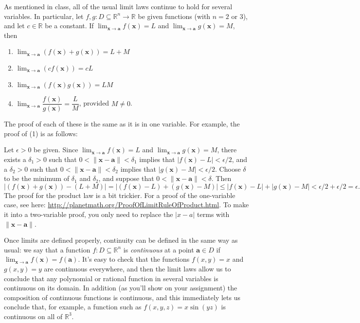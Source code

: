 \documentclass[letterpaper,12pt]{article}
\newcommand{\aaa}{\mathbf{a}}
\newcommand{\abs}[1]{\lvert #1\rvert}
\newcommand{\len}[1]{\lVert #1\rVert}
\newcommand{\x}{\mathbf{x}}
\newcommand{\R}{\mathbb{R}}
\newcommand{\di}{\displaystyle}
\begin{document}
As mentioned in class, all of the usual limit laws continue to hold for several variables. In particular, let $f,g:D\subseteq\R^n\to \R$ be given functions (with $n=2$ or 3), and let $c\in\R$ be a constant. If $\di \lim_{\x\to\aaa}f(\x) = L$ and $\di \lim_{\x\to\aaa}g(\x)=M$, then
\begin{enumerate}
 \item $\lim_{\x\to\aaa}(f(\x)+g(\x)) = L+M$
 \item $\lim_{\x\to\aaa}(cf(\x)) = cL$
 \item $\lim_{\x\to\aaa}(f(\x)g(\x)) = LM$
 \item $\lim_{\x\to\aaa}\dfrac{f(\x)}{g(\x)} = \dfrac{L}{M}$, provided $M\neq 0$.
\end{enumerate}
The proof of each of these is the same as it is in one variable. For example, the proof of (1) is as follows:

\medskip

Let $\epsilon>0$ be given. Since $\di \lim_{\x\to\aaa}f(\x) = L$ and $\di \lim_{\x\to\aaa}g(\x)=M$, there exists a $\delta_1>0$ such that $0<\len{\x-\aaa}<\delta_1$ implies that $\abs{f(\x)-L}<\epsilon/2$, and a $\delta_2>0$ such that $0<\len{\x-\aaa}<\delta_2$ implies that $\abs{g(\x)-M}<\epsilon/2$. Choose $\delta$ to be the minimum of $\delta_1$ and $\delta_2$, and suppose that $0<\len{\x-\aaa}<\delta$. Then
\[
 \abs{(f(\x)+g(\x))-(L+M)} = \abs{(f(\x)-L)+(g(\x)-M)}\leq \abs{f(\x)-L}+\abs{g(\x)-M}<\epsilon/2+\epsilon/2=\epsilon.
\]
The proof for the product law is a bit trickier. For a proof of the one-variable case, see here: \href{http://planetmath.org/ProofOfLimitRuleOfProduct.html}{http://planetmath.org/ProofOfLimitRuleOfProduct.html}. To make it into a two-variable proof, you only need to replace the $\abs{x-a}$ terms with $\len{\x-\aaa}$.

\bigskip

Once limits are defined properly, continuity can be defined in the same way as usual: we say that a function $f:D\subseteq\R^n$ is {\em continuous} at a point $\aaa\in D$ if $\di \lim_{\x\to \aaa}f(\x) = f(\aaa)$. It's easy to check that the functions $f(x,y)=x$ and $g(x,y)=y$ are continuous everywhere, and then the limit laws allow us to conclude that any polynomial or rational function in several variables is continuous on its domain. In addition (as you'll show on your assignment) the composition of continuous functions is continuous, and this immediately lets us conclude that, for example, a function such as $f(x,y,z) = x\sin(yz)$ is continuous on all of $\R^3$.
\end{document}
